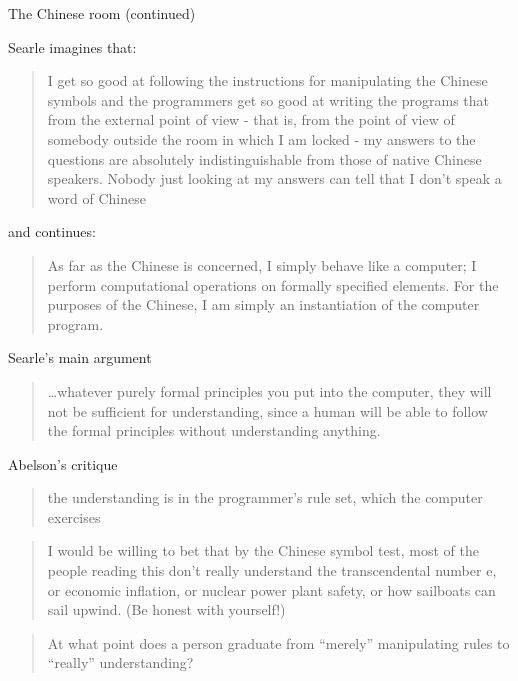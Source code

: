 \documentclass[10pt]{beamer}
\begin{document}
\begin{titledslide}{The Chinese room (continued)}

  Searle imagines that:
  \begin{quote}
    I get so good at following the instructions for manipulating the
    Chinese symbols and the programmers get so good at writing the
    programs that from the external point of view - that is, from the
    point of view of somebody outside the room in which I am locked -
    my answers to the questions are absolutely indistinguishable from
    those of native Chinese speakers. Nobody just looking at my
    answers can tell that I don't speak a word of Chinese
  \end{quote}

and continues:
  
  \begin{quote}
    As far as the Chinese is concerned, I simply behave like a
    computer; I perform computational operations on formally specified
    elements. For the purposes of the Chinese, I am simply an
    instantiation of the computer program.
  \end{quote}

\end{titledslide}
\begin{titledslide}{Searle's main argument}

  \begin{quote}
    \dots whatever purely formal principles you put into the computer,
    they will not be sufficient for understanding, since a human will
    be able to follow the formal principles without understanding
    anything.
  \end{quote}
  
\end{titledslide}
\begin{titledslide}{Abelson's critique}

  \begin{quote}
    the understanding is in the programmer's rule set, which the
    computer exercises
  \end{quote}

  \begin{quote}
    I would be willing to bet that by the Chinese symbol test, most
    of the people reading this don't really understand the
    transcendental number e, or economic inflation, or nuclear power
    plant safety, or how sailboats can sail upwind. (Be honest with
    yourself!)
  \end{quote}
  
  \begin{quote}
    At what point does a person graduate from ``merely'' manipulating
    rules to ``really'' understanding?
  \end{quote}
  
\end{titledslide}
\end{document}
